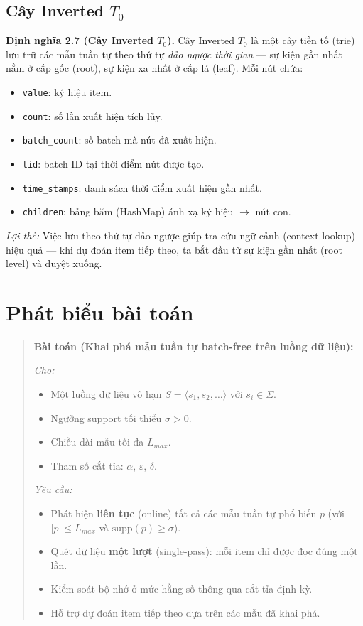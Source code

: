 \documentclass[a4paper,12pt]{report}
\begin{document}
\subsection{Cây Inverted $T_0$}

\textbf{Định nghĩa 2.7 (Cây Inverted $T_0$).} Cây Inverted $T_0$ là một cây tiền tố (trie) lưu trữ các mẫu tuần tự theo thứ tự \textit{đảo ngược thời gian} --- sự kiện gần nhất nằm ở cấp gốc (root), sự kiện xa nhất ở cấp lá (leaf). Mỗi nút chứa:
\begin{itemize}
    \item \texttt{value}: ký hiệu item.
    \item \texttt{count}: số lần xuất hiện tích lũy.
    \item \texttt{batch\_count}: số batch mà nút đã xuất hiện.
    \item \texttt{tid}: batch ID tại thời điểm nút được tạo.
    \item \texttt{time\_stamps}: danh sách thời điểm xuất hiện gần nhất.
    \item \texttt{children}: bảng băm (HashMap) ánh xạ ký hiệu $\rightarrow$ nút con.
\end{itemize}

\textit{Lợi thế:} Việc lưu theo thứ tự đảo ngược giúp tra cứu ngữ cảnh (context lookup) hiệu quả --- khi dự đoán item tiếp theo, ta bắt đầu từ sự kiện gần nhất (root level) và duyệt xuống.

\section{Phát biểu bài toán}
\label{sec:problem}

\begin{quote}
\textbf{Bài toán (Khai phá mẫu tuần tự batch-free trên luồng dữ liệu):}

\textit{Cho:}
\begin{itemize}
    \item Một luồng dữ liệu vô hạn $S = \langle s_1, s_2, \dots \rangle$ với $s_i \in \Sigma$.
    \item Ngưỡng support tối thiểu $\sigma > 0$.
    \item Chiều dài mẫu tối đa $L_{max}$.
    \item Tham số cắt tỉa: $\alpha$, $\varepsilon$, $\delta$.
\end{itemize}

\textit{Yêu cầu:}
\begin{itemize}
    \item Phát hiện \textbf{liên tục} (online) tất cả các mẫu tuần tự phổ biến $p$ (với $|p| \leq L_{max}$ và $\text{supp}(p) \geq \sigma$).
    \item Quét dữ liệu \textbf{một lượt} (single-pass): mỗi item chỉ được đọc đúng một lần.
    \item Kiểm soát bộ nhớ ở mức hằng số thông qua cắt tỉa định kỳ.
    \item Hỗ trợ dự đoán item tiếp theo dựa trên các mẫu đã khai phá.
\end{itemize}
\end{quote}
\end{document}
